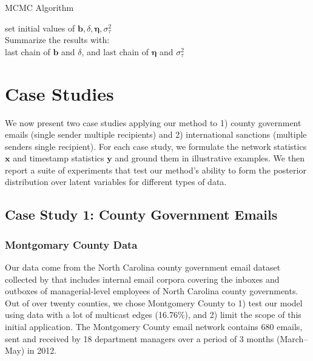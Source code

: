 \documentclass[12pt]{article}
\begin{document}
 \begin{algorithm}[H]
 	\SetAlgoLined
 	\caption{MCMC Algorithm}
 	set initial values of $\boldsymbol{b}, \delta, \boldsymbol{\eta}, \sigma_\tau^2$\\
 	Summarize the results with: \\last chain of $\boldsymbol{b}$ and $\delta$, and last chain of $\boldsymbol{\eta}$ and $\sigma_\tau^2$ 
 \end{algorithm}
\section{Case Studies}\label{sec:case studies}
We now present two case studies applying our method to 1) county government emails (single sender multiple recipients) and 2) international sanctions (multiple senders single recipient). For each case study,
we formulate the network statistics $\boldsymbol{x}$ and timestamp statistics $\boldsymbol{y}$ and ground them in
illustrative examples. We then report a suite of experiments that test our method’s ability to form the posterior distribution over latent variables for different types of data. 
 	   \subsection{Case Study 1: County Government Emails}\label{subsec:Emails}
 	  	   \subsubsection{Montgomary County Data}\label{subsubsec:Montgomery}
 	   Our data come from the North Carolina county government email dataset collected by \cite{ben2017transparency} that includes internal email corpora covering the inboxes and outboxes of managerial-level employees of North Carolina county governments. Out of over twenty counties, we chose Montgomery County to 1) test our model using data with a lot of multicast edges (16.76\%), and 2) limit the scope of this initial application. The Montgomery County email network contains 680 emails, sent and received by 18 department managers over a period of 3 months (March--May) in 2012. 
\end{document}
